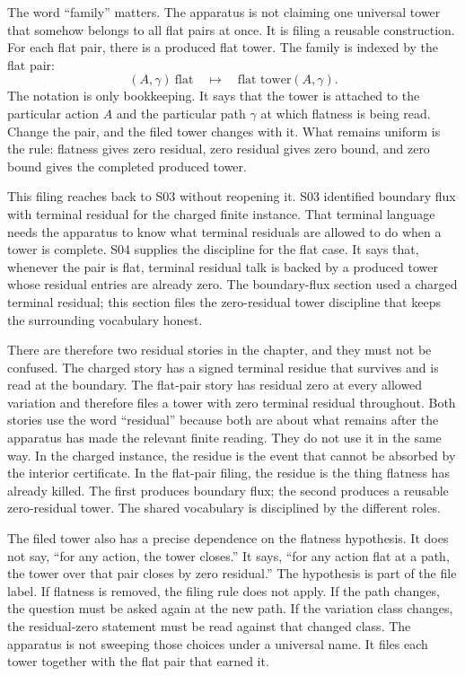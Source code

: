 The word ``family'' matters. The apparatus is not claiming one universal tower
that somehow belongs to all flat pairs at once. It is filing a reusable
construction. For each flat pair, there is a produced flat tower. The family is
indexed by the flat pair:
\[
  (A,\gamma)\ \text{flat}
  \quad\longmapsto\quad
  \text{flat tower}(A,\gamma).
\]
The notation is only bookkeeping. It says that the tower is attached to the
particular action \(A\) and the particular path \(\gamma\) at which flatness is
being read. Change the pair, and the filed tower changes with it. What remains
uniform is the rule: flatness gives zero residual, zero residual gives zero
bound, and zero bound gives the completed produced tower.

This filing reaches back to S03 without reopening it. S03 identified boundary
flux with terminal residual for the charged finite instance. That terminal
language needs the apparatus to know what terminal residuals are allowed to do
when a tower is complete. S04 supplies the discipline for the flat case. It
says that, whenever the pair is flat, terminal residual talk is backed by a
produced tower whose residual entries are already zero. The boundary-flux
section used a charged terminal residual; this section files the zero-residual
tower discipline that keeps the surrounding vocabulary honest.

There are therefore two residual stories in the chapter, and they must not be
confused. The charged story has a signed terminal residue that survives and is
read at the boundary. The flat-pair story has residual zero at every allowed
variation and therefore files a tower with zero terminal residual throughout.
Both stories use the word ``residual'' because both are about what remains
after the apparatus has made the relevant finite reading. They do not use it in
the same way. In the charged instance, the residue is the event that cannot be
absorbed by the interior certificate. In the flat-pair filing, the residue is
the thing flatness has already killed. The first produces boundary flux; the
second produces a reusable zero-residual tower. The shared vocabulary is
disciplined by the different roles.

The filed tower also has a precise dependence on the flatness hypothesis. It
does not say, ``for any action, the tower closes.'' It says, ``for any action
flat at a path, the tower over that pair closes by zero residual.'' The
hypothesis is part of the file label. If flatness is removed, the filing rule
does not apply. If the path changes, the question must be asked again at the
new path. If the variation class changes, the residual-zero statement must be
read against that changed class. The apparatus is not sweeping those choices
under a universal name. It files each tower together with the flat pair that
earned it.

